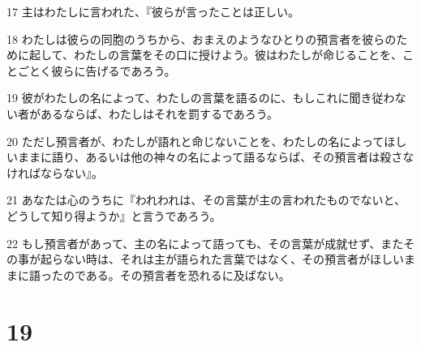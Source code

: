 \par 17 主はわたしに言われた、『彼らが言ったことは正しい。
\par 18 わたしは彼らの同胞のうちから、おまえのようなひとりの預言者を彼らのために起して、わたしの言葉をその口に授けよう。彼はわたしが命じることを、ことごとく彼らに告げるであろう。
\par 19 彼がわたしの名によって、わたしの言葉を語るのに、もしこれに聞き従わない者があるならば、わたしはそれを罰するであろう。
\par 20 ただし預言者が、わたしが語れと命じないことを、わたしの名によってほしいままに語り、あるいは他の神々の名によって語るならば、その預言者は殺さなければならない』。
\par 21 あなたは心のうちに『われわれは、その言葉が主の言われたものでないと、どうして知り得ようか』と言うであろう。
\par 22 もし預言者があって、主の名によって語っても、その言葉が成就せず、またその事が起らない時は、それは主が語られた言葉ではなく、その預言者がほしいままに語ったのである。その預言者を恐れるに及ばない。

\chapter{19}

